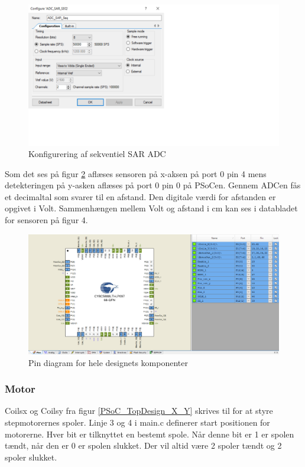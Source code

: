 \begin{figure}[H]
	\centering
\includegraphics[scale=0.8]{Screenshots/ADC_SAR_SEQ.png}
\caption{Konfigurering af sekventiel SAR ADC}
\label{ADC_SAR_SEQ}
\end{figure}

Som det ses på figur \ref{PSoC_X_Y_pin_configuration} aflæses sensoren på x-aksen på port 0 pin 4 mens detekteringen på y-asken aflæses på port 0 pin 0 på PSoCen. Gennem ADCen fås et decimaltal som svarer til en afstand. Den digitale værdi for afstanden er opgivet i Volt. Sammenhængen mellem Volt og afstand i cm kan ses i databladet for sensoren på figur 4.

\begin{figure}[H]
\includegraphics[scale=0.22]{Screenshots/PSoC_X_Y_pin_configuration.png}
\caption{Pin diagram for hele designets komponenter}
\label{PSoC_X_Y_pin_configuration}
\end{figure}

\subsubsection{Motor}
Coils\textunderscore x og Coils\textunderscore y fra figur \ref{PSoC_TopDesign_X_Y} skrives til for at styre stepmotorernes spoler. Linje 3 og 4 i main.c definerer start positionen for motorerne. Hver bit er tilknyttet en bestemt spole. Når denne bit er 1 er spolen tændt, når den er 0 er spolen slukket. Der vil altid være 2 spoler tændt og 2 spoler slukket.

